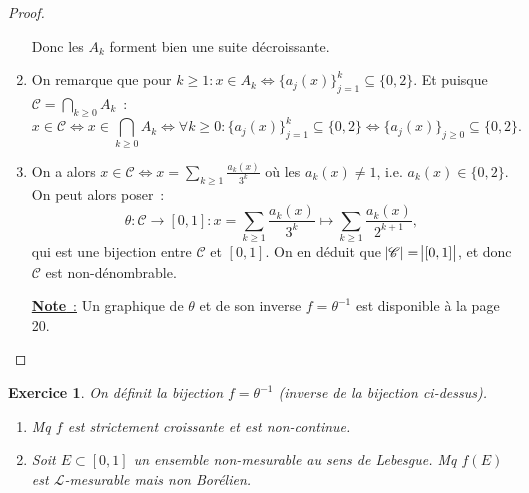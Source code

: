 \documentclass{article}
\newtheorem{ex}{Exercice}[section]
\begin{document}
\begin{proof}
\begin{enumerate}
	Donc les $A_k$ forment bien une suite décroissante.

	\item On remarque que pour $k \geq 1 : x \in A_k \iff \{a_j(x)\}_{j=1}^k \subseteq \{0, 2\}$. Et puisque $\mathscr C = \bigcap_{k \geq 0}A_k$~:
	\[x \in \mathscr C \iff x \in \bigcap_{k \geq 0}A_k \iff \forall k \geq 0 : \{a_j(x)\}_{j=1}^k \subseteq \{0, 2\} \iff \{a_j(x)\}_{j \geq 0} \subseteq \{0, 2\}.\]

	\item On a alors $x \in \mathscr C \iff x = \sum_{k \geq 1}\frac {a_k(x)}{3^k}$ où les $a_k(x) \neq 1$, i.e. $a_k(x) \in \{0, 2\}$. On peut alors poser~:
	\[\theta : \mathscr C \to [0, 1] : x = \sum_{k \geq 1}\frac {a_k(x)}{3^k} \mapsto \sum_{k \geq 1}\frac {a_k(x)}{2^{k+1}},\]
	qui est une bijection entre $\mathscr C$ et $[0, 1]$. On en déduit que $\abs {\mathscr C} = \abs {[0, 1]}$, et donc $\mathscr C$ est non-dénombrable.

	\underline {\textbf{Note}~:} Un graphique de $\theta$ et de son inverse $f = \theta^{-1}$ est disponible à la page 20.
\end{enumerate}
\end{proof}

\begin{ex} On définit la bijection $f = \theta^{-1}$ (inverse de la bijection ci-dessus).
\begin{enumerate}
	\item Mq $f$ est strictement croissante et est non-continue.
	\item Soit $E \subset [0, 1]$ un ensemble non-mesurable au sens de Lebesgue. Mq $f(E)$ est $\mathcal L$-mesurable mais non Borélien.
\end{enumerate}
\end{ex}
\end{document}
